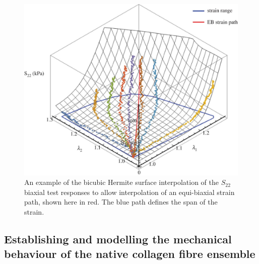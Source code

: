     
\begin{figure}
\centering
\includegraphics[width=5in]{Images/chapter3/F4large.jpg}
\caption{An example of the bicubic Hermite surface interpolation of the $S_{22}$ biaxial test responses to allow interpolation of an equi-biaxial strain path, shown here in red. The blue path defines the span of the strain.}
\label{c3:fig:4}
\end{figure}
    


\subsection{Establishing and modelling the mechanical behaviour of the native collagen fibre ensemble}
    
